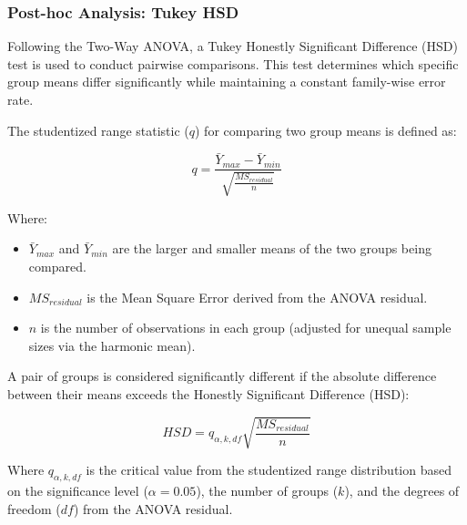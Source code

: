 


\subsubsection*{Post-hoc Analysis: Tukey HSD}
Following the Two-Way ANOVA, a Tukey Honestly Significant Difference (HSD) test 
is used to conduct pairwise comparisons. This test determines which specific 
group means differ significantly while maintaining a constant family-wise 
error rate.

The studentized range statistic ($q$) for comparing two group means is defined as:

\begin{equation}
    q = \frac{\bar{Y}_{max} - \bar{Y}_{min}}{\sqrt{\frac{MS_{residual}}{n}}}
\end{equation}

Where:
\begin{itemize}
    \item $\bar{Y}_{max}$ and $\bar{Y}_{min}$ are the larger and smaller means of the two groups being compared.
    \item $MS_{residual}$ is the Mean Square Error derived from the ANOVA residual.
    \item $n$ is the number of observations in each group (adjusted for unequal sample sizes via the harmonic mean).
\end{itemize}

A pair of groups is considered significantly different if the absolute difference 
between their means exceeds the Honestly Significant Difference (HSD):

\begin{equation}
    HSD = q_{\alpha, k, df} \sqrt{\frac{MS_{residual}}{n}}
\end{equation}

Where $q_{\alpha, k, df}$ is the critical value from the studentized range 
distribution based on the significance level ($\alpha = 0.05$), the number 
of groups ($k$), and the degrees of freedom ($df$) from the ANOVA residual.

\newpage 
